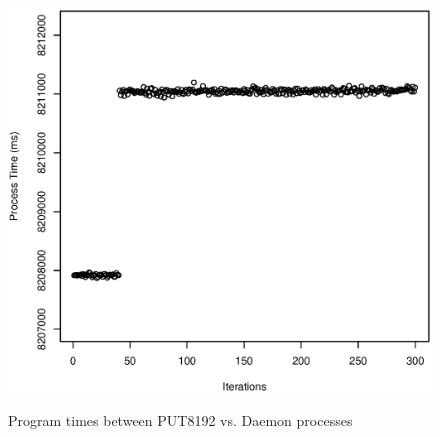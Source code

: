 \documentclass[10pt]{article}
\begin{document}
\begin{figure}[htp!]
{		\includegraphics[scale=0.35]{put8192_pt.eps}
		\label{fig:put8192_pt}
	}
	\caption{Program times between PUT8192 vs. Daemon processes~\label{fig:put_daemon_pt6}}
\end{figure}
\end{document}
